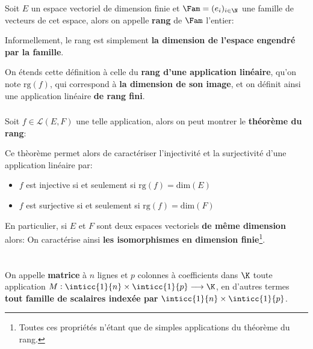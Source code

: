 Soit \(E\) un espace vectoriel de dimension finie et \(\Fam = (e_i)_{i \in \N}\) une famille de vecteurs de cet espace, alors on appelle \textbf{rang} de \(\Fam\) l'entier:

Informellement, le rang est simplement \textbf{la dimension de l'espace engendré par la famille}.\<

On étends cette définition à celle du \textbf{rang d'une application linéaire}, qu'on note \(\text{rg}(f)\), qui correspond à \textbf{la dimension de son image}, et on définit ainsi une application linéaire \textbf{de rang fini}.

\subsection*{}

Soit \(f \in \mathcal{L}(E, F)\) une telle application, alors on peut montrer le \textbf{théorème du rang}:

Ce thèorème permet alors de caractériser l'injectivité et la surjectivité d'une application linéaire par:
\begin{itemize}
   \item \(f\) est injective si et seulement si \(\text{rg}(f) = \text{dim}(E)\)
   \item \(f\) est surjective si et seulement si \(\text{rg}(f) = \text{dim}(F)\)
\end{itemize}

En particulier, si \(E\) et \(F\) sont deux espaces vectoriels \textbf{de même dimension} alors:
On caractérise ainsi \textbf{les isomorphismes en dimension finie}\footnote[2]{Toutes ces propriétés n'étant que de simples applications du théorème du rang.}.

\chapter*{} %

On appelle \textbf{matrice} à \(n\) lignes et \(p\) colonnes à coefficients dans \(\K\) toute application \(M : \inticc{1}{n} \times \inticc{1}{p} \longrightarrow \K\), en d'autres termes \textbf{tout famille de scalaires indexée par }\(\inticc{1}{n} \times \inticc{1}{p}\).\<

